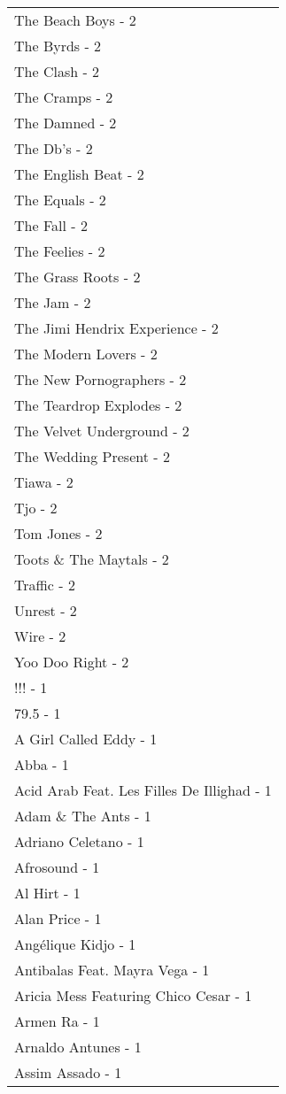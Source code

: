 \documentclass[
]{article}
\begin{document}
\begin{longtable}{l}
The Beach Boys - 2 \\ 
The Byrds - 2 \\ 
The Clash - 2 \\ 
The Cramps - 2 \\ 
The Damned - 2 \\ 
The Db's - 2 \\ 
The English Beat - 2 \\ 
The Equals - 2 \\ 
The Fall - 2 \\ 
The Feelies - 2 \\ 
The Grass Roots - 2 \\ 
The Jam - 2 \\ 
The Jimi Hendrix Experience - 2 \\ 
The Modern Lovers - 2 \\ 
The New Pornographers - 2 \\ 
The Teardrop Explodes - 2 \\ 
The Velvet Underground - 2 \\ 
The Wedding Present - 2 \\ 
Tiawa - 2 \\ 
Tjo - 2 \\ 
Tom Jones - 2 \\ 
Toots \& The Maytals - 2 \\ 
Traffic - 2 \\ 
Unrest - 2 \\ 
Wire - 2 \\ 
Yoo Doo Right - 2 \\ 
!!! - 1 \\ 
79.5 - 1 \\ 
A Girl Called Eddy - 1 \\ 
Abba - 1 \\ 
Acid Arab Feat. Les Filles De Illighad - 1 \\ 
Adam \& The Ants - 1 \\ 
Adriano Celetano - 1 \\ 
Afrosound - 1 \\ 
Al Hirt - 1 \\ 
Alan Price - 1 \\ 
Angélique Kidjo - 1 \\ 
Antibalas Feat. Mayra Vega - 1 \\ 
Aricia Mess Featuring Chico Cesar - 1 \\ 
Armen Ra - 1 \\ 
Arnaldo Antunes - 1 \\ 
Assim Assado - 1 \\ 

\end{longtable}
\end{document}
